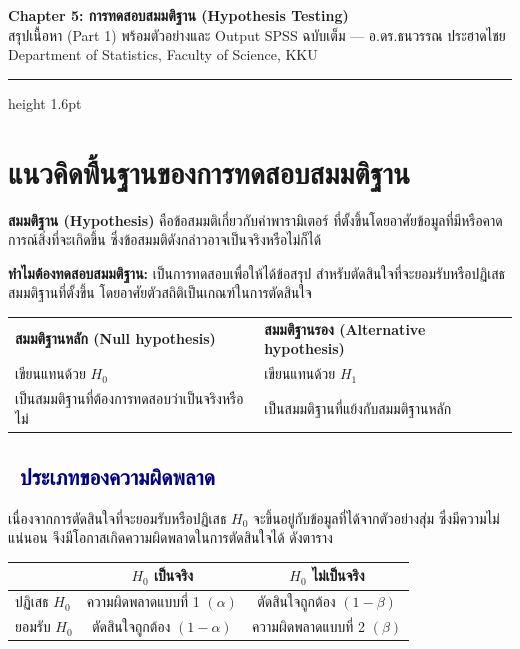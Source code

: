 \documentclass[10pt]{extarticle}
\newcommand{\dist}[1]{\subsection*{\textcolor{navy}{\textbullet\ #1}}}
\begin{document}
\begin{center}
{\LARGE\bfseries\color{navy} Chapter 5: การทดสอบสมมติฐาน (Hypothesis Testing)}\\[3pt]
{\normalsize สรุปเนื้อหา (Part 1) พร้อมตัวอย่างและ Output SPSS ฉบับเต็ม — อ.ดร.ธนวรรณ ประฮาดไชย \quad Department of Statistics, Faculty of Science, KKU}
\end{center}
\vspace{3pt}
{\color{gold}\hrule height 1.6pt}
\vspace{6pt}

\section{แนวคิดพื้นฐานของการทดสอบสมมติฐาน}

\textbf{สมมติฐาน (Hypothesis)} คือข้อสมมติเกี่ยวกับค่าพารามิเตอร์ ที่ตั้งขึ้นโดยอาศัยข้อมูลที่มีหรือคาดการณ์สิ่งที่จะเกิดขึ้น ซึ่งข้อสมมติดังกล่าวอาจเป็นจริงหรือไม่ก็ได้

\textbf{ทำไมต้องทดสอบสมมติฐาน:} เป็นการทดสอบเพื่อให้ได้ข้อสรุป สำหรับตัดสินใจที่จะยอมรับหรือปฏิเสธสมมติฐานที่ตั้งขึ้น โดยอาศัยตัวสถิติเป็นเกณฑ์ในการตัดสินใจ

\begin{center}
\begin{tabular}{@{}ll@{}}
\rowcolor{lightbg}\textbf{สมมติฐานหลัก (Null hypothesis)} & \textbf{สมมติฐานรอง (Alternative hypothesis)}\\
เขียนแทนด้วย $H_0$ & เขียนแทนด้วย $H_1$\\
เป็นสมมติฐานที่ต้องการทดสอบว่าเป็นจริงหรือไม่ & เป็นสมมติฐานที่แย้งกับสมมติฐานหลัก\\
\end{tabular}
\end{center}

\dist{ประเภทของความผิดพลาด}
เนื่องจากการตัดสินใจที่จะยอมรับหรือปฏิเสธ $H_0$ จะขึ้นอยู่กับข้อมูลที่ได้จากตัวอย่างสุ่ม ซึ่งมีความไม่แน่นอน จึงมีโอกาสเกิดความผิดพลาดในการตัดสินใจได้ ดังตาราง

\begin{center}
\small
\begin{tabular}{l|cc}
\rowcolor{lightbg} & $H_0$ เป็นจริง & $H_0$ ไม่เป็นจริง\\\hline
ปฏิเสธ $H_0$ & ความผิดพลาดแบบที่ 1 $(\alpha)$ & ตัดสินใจถูกต้อง $(1-\beta)$\\
ยอมรับ $H_0$ & ตัดสินใจถูกต้อง $(1-\alpha)$ & ความผิดพลาดแบบที่ 2 $(\beta)$\\
\end{tabular}
\end{center}
\end{document}

